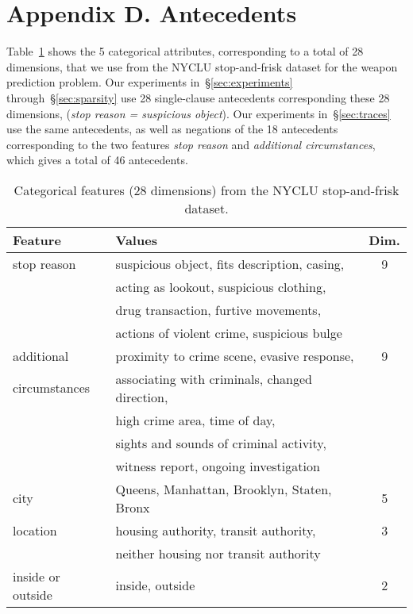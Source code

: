 \section*{Appendix D. Antecedents}

Table~\ref{tab:frisk-data} shows the 5 categorical attributes,
corresponding to a total of 28 dimensions, that we use from the
NYCLU stop-and-frisk dataset for the weapon prediction problem.
%
Our experiments in~\S\ref{sec:experiments} through~\S\ref{sec:sparsity}
use 28 single-clause antecedents corresponding these 28 dimensions,
\eg (\emph{stop reason = suspicious object}).
%
Our experiments in~\S\ref{sec:traces} use the same antecedents,
as well as negations of the 18 antecedents corresponding to the two features
\emph{stop reason} and \emph{additional circumstances},
which gives a total of 46 antecedents.

\begin{table}[h!]
\centering
\begin{tabular}{l | l | c}
Feature & Values & Dim. \\
\hline
stop reason & suspicious object, fits description, casing, & 9 \\
& acting as lookout, suspicious clothing, & \\
& drug transaction, furtive movements, & \\
& actions of violent crime, suspicious bulge \\
\hline
additional & proximity to crime scene, evasive response,  & 9 \\
circumstances & associating with criminals, changed direction, & \\
& high crime area, time of day,  & \\
& sights and sounds of criminal activity, & \\
& witness report, ongoing investigation & \\
\hline
city & Queens,  Manhattan, Brooklyn, Staten, Bronx & 5 \\
\hline
location & housing authority, transit authority, & 3 \\
& neither housing nor transit authority & \\
\hline
inside or outside & inside, outside & 2 \\
\end{tabular}
\caption{Categorical features (28 dimensions) from the NYCLU stop-and-frisk dataset.}
\vspace{4mm}
\label{tab:frisk-data}
\end{table}


